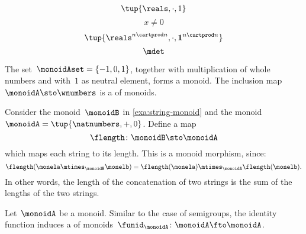 {\begin{forslides}
        \begin{equation}
            \label{eq:reals-times-one}
            \tup{\reals , \cdot, 1}
        \end{equation}
        \begin{equation}
            \label{eq:reals-times-one-non}
            x \neq 0
        \end{equation}
        \begin{equation}
            \label{eq:matrices-times}
            \tup{\reals^{n\cartprod n}, \cdot, \mathbf{1}^{n\cartprod n}}
        \end{equation}
        \begin{equation}
            \label{eq:det}
            \mdet
        \end{equation}
    \end{forslides}
}%

\begin{example}
    The set~$\monoidAset = \{ -1, 0, 1 \}$, together with multiplication of whole numbers and with~$1$ as neutral element, forms a monoid.
    The inclusion map~$\monoidA \sto \wnumbers$ is a \whomo of monoids.
\end{example}

\begin{example}
    \label{exa:string-length}
    Consider the monoid~$\monoidB$ in \cref{exa:string-monoid} and the monoid~$\monoidA=\tup{\natnumbers, +,0}$.
    Define a map
    \begin{equation*}
        \flength \colon \monoidB \sto \monoidA
    \end{equation*}
    which maps each string to its length.
    This is a monoid morphism, since:
    \begin{equation*}
        \flength(\monela \mtimes_\monoidB \monelb)=\flength(\monela)\mtimes_\monoidA \flength(\monelb).
    \end{equation*}
    In other words, the length of the concatenation of two strings is the sum of the lengths of the two strings.
\end{example}

\begin{ctdefinition}
    \label{def:identity-mon-mor}
    Let~$\monoidA$ be a monoid.
    Similar to the case of semigroups, the identity function induces a \whomo of monoids~$\funid_\monoidA\colon \monoidA \fto \monoidA$.
\end{ctdefinition}



